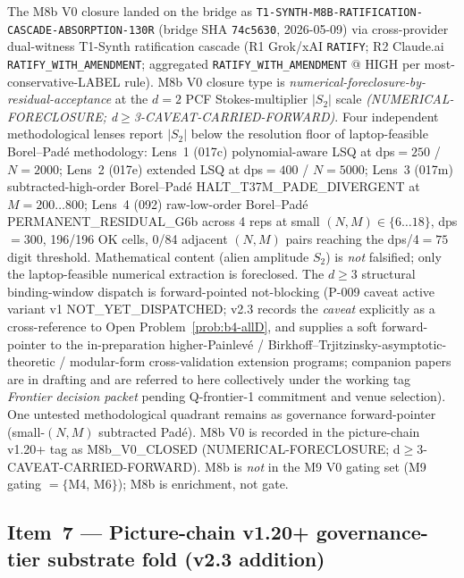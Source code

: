 \documentclass[11pt,a4paper]{article}
\theoremstyle{definition}
\theoremstyle{remark}
\begin{document}
The M8b V0 closure landed on the bridge as
\texttt{T1-SYNTH-M8B-RATIFICATION-CASCADE-ABSORPTION-130R} (bridge
SHA \texttt{74c5630}, 2026-05-09) via cross-provider dual-witness
T1-Synth ratification cascade (R1 Grok/xAI \verb|RATIFY|; R2
Claude.ai \verb|RATIFY_WITH_AMENDMENT|; aggregated
\verb|RATIFY_WITH_AMENDMENT| @ HIGH per most-conservative-LABEL
rule). M8b V0 closure type is
\emph{numerical-foreclosure-by-residual-acceptance} at the $d=2$ PCF
Stokes-multiplier $|S_2|$ scale \emph{(NUMERICAL-FORECLOSURE; d$\geq$3-CAVEAT-CARRIED-FORWARD)}.
Four independent methodological
lenses report $|S_2|$ below the resolution floor of laptop-feasible
Borel--Pad\'e methodology: Lens~1 (017c) polynomial-aware LSQ at
dps$=250$ / $N=2000$; Lens~2 (017e) extended LSQ at dps$=400$ /
$N=5000$; Lens~3 (017m) subtracted-high-order Borel--Pad\'e
\textsf{HALT\_T37M\_PADE\_DIVERGENT} at $M=200{\ldots}800$; Lens~4
(092) raw-low-order Borel--Pad\'e \textsf{PERMANENT\_RESIDUAL\_G6b}
across 4 reps at small $(N,M) \in \{6{\ldots}18\}$, dps$=300$,
196/196 OK cells, 0/84 adjacent $(N,M)$ pairs reaching the
dps/4$=75$ digit threshold. Mathematical content (alien amplitude
$S_2$) is \emph{not} falsified; only the laptop-feasible numerical
extraction is foreclosed. The $d \geq 3$ structural binding-window
dispatch is forward-pointed not-blocking (P-009 caveat active
variant v1 \textsf{NOT\_YET\_DISPATCHED}; v2.3 records the
\emph{caveat} explicitly as a cross-reference to Open
Problem~\ref{prob:b4-allD}, and supplies a soft forward-pointer
to the in-preparation higher-Painlev\'e /
Birkhoff--Trjitzinsky-asymptotic-theoretic / modular-form
cross-validation extension programs; companion papers are in
drafting and are referred to here collectively under the
working tag \emph{Frontier decision packet} pending Q-frontier-1
commitment and venue selection). One
untested methodological quadrant remains as governance
forward-pointer (small-$(N,M)$ subtracted Pad\'e). M8b V0 is
recorded in the picture-chain v1.20+ tag as
\textsf{M8b\_V0\_CLOSED (NUMERICAL-FORECLOSURE; d$\geq$3-CAVEAT-CARRIED-FORWARD)}.
M8b is \emph{not} in the M9 V0 gating set (M9 gating $= \{$M4, M6$\}$);
M8b is enrichment, not gate.

\subsection{Item~7 --- Picture-chain v1.20+ governance-tier substrate fold (v2.3 addition)}
\label{sec:closure-cascade-picture}
\end{document}
